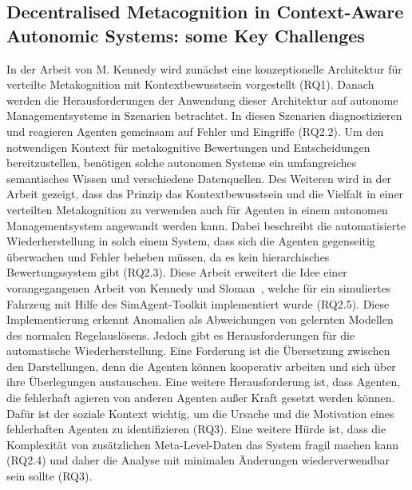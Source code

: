 \documentclass[conference,compsoc]{IEEEtran}
\begin{document}
\subsection{Decentralised Metacognition in Context-Aware Autonomic Systems: some Key Challenges}
In der Arbeit von M. Kennedy \cite{kennedy2010decentralised} wird zunächst eine konzeptionelle Architektur für verteilte Metakognition mit Kontextbewusstsein vorgestellt (RQ1). Danach werden die Herausforderungen der Anwendung dieser Architektur auf autonome Managementsysteme in Szenarien betrachtet. In diesen Szenarien diagnostizieren und reagieren Agenten gemeinsam auf Fehler und Eingriffe (RQ2.2). Um den notwendigen Kontext für metakognitive Bewertungen und Entscheidungen bereitzustellen, benötigen solche autonomen Systeme ein umfangreiches semantisches Wissen und verschiedene Datenquellen.  Des Weiteren wird in der Arbeit gezeigt, dass das Prinzip das Kontextbewusstsein und die Vielfalt in einer verteilten Metakognition zu verwenden auch für Agenten in einem autonomen Managementsystem angewandt werden kann. Dabei beschreibt die automatisierte Wiederherstellung in solch einem System, dass sich die Agenten gegenseitig überwachen und Fehler beheben müssen, da es kein hierarchisches Bewertungssystem gibt (RQ2.3). Diese Arbeit erweitert die Idee einer vorangegangenen Arbeit von Kennedy und Sloman~\cite{kennedy2003autonomous}, welche für ein simuliertes Fahrzeug mit Hilfe des SimAgent-Toolkit implementiert wurde (RQ2.5). Diese Implementierung erkennt Anomalien als Abweichungen von gelernten Modellen des normalen Regelauslösens. Jedoch gibt es Herausforderungen für die automatische Wiederherstellung. Eine Forderung ist die Übersetzung zwischen den Darstellungen, denn die Agenten können kooperativ arbeiten und sich über ihre Überlegungen austauschen. Eine weitere Herausforderung ist, dass Agenten, die fehlerhaft agieren von anderen Agenten außer Kraft gesetzt werden können. Dafür ist der soziale Kontext wichtig, um die Ursache und die Motivation eines fehlerhaften Agenten zu identifizieren (RQ3). Eine weitere Hürde ist, dass die Komplexität von zusätzlichen Meta-Level-Daten das System fragil machen kann (RQ2.4) und daher die Analyse mit minimalen Änderungen wiederverwendbar sein sollte (RQ3).
\end{document}
